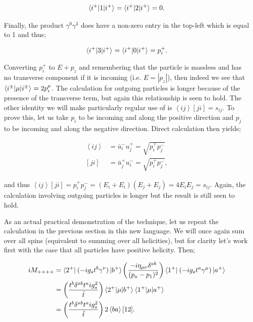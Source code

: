\begin{equation}
\mathinner{\langle i^+\vert1\vert i^+\rangle}_{} = \mathinner{\langle i^+\vert2\vert i^+\rangle}_{} = 0.
\end{equation}

Finally, the product $\gamma^0 \gamma^3$ does have a non-zero entry in the top-left which is equal to 1 and thus;

\begin{equation}
\mathinner{\langle i^+\vert3\vert i^+\rangle}_{} = \mathinner{\langle i^+\vert0\vert i^+\rangle}_{} =  p_i^+.
\end{equation}

Converting $p_i^+$ to $E + p_z$ and remembering that the particle is massless and has no transverse component if it is incoming (i.e. $E = |p_z|$), then indeed we see that $\mathinner{\langle i^\pm\vert\mu\vert i^\pm\rangle}_{} = 2p_i^\mu$. The calculation for outgoing particles is longer because of the presence of the transverse term, but again this relationship is seen to hold. The other identity we will make particularly regular use of is $\left<i j \right> [ji] = s_{ij}$. To prove this, let us take $p_i$ to be incoming and along the positive direction and $p_j$ to be incoming and along the negative direction. Direct calculation then yields;

\begin{equation}
\begin{split}
\left< i j \right> &= \bar{u}_i^- u_j^+ = \sqrt{p_i^+ p_j^-} \\
[ j i] &= \bar{u}_j^+ u_i^- = \sqrt{p_i^+ p_j^-},
\end{split}
\end{equation}

and thus $\left<i j \right> [ji] = p_i^+ p_j^- = (E_i + E_i)(E_j + E_j) = 4 E_i E_j = s_{ij}$. Again, the calculation involving outgoing particles is longer but the result is still seen to hold. 

As an actual practical demonstration of the technique, let us repeat the calculation in the previous section in this new language. We will once again sum over all spins (equivalent to summing over all helicities), but for clarity let's work first with the case that all particles have positive helicity. Then;

\begin{equation}
\begin{split}
iM_{++++} &= \mathinner{\langle 2^+\rvert}_{}(-i g_s t^b \gamma^\nu) \mathinner{\lvert b^+\rangle}_{\hspace{-0.1em}} \left( \frac{- i \eta_{\mu \nu}\delta^{ab}}{(p_a - p_1)^2} \right)\mathinner{\langle 1^+\rvert}_{} (-i g_s t^a \gamma^\mu)\mathinner{\lvert a^+\rangle}_{\hspace{-0.1em}} \\
& = \left(\frac{t^b \delta^{ab} t^a i g_s^2}{\hat{t}} \right) \mathinner{\langle2^+\vert\mu\vert b^+\rangle}_{} \mathinner{\langle1^+\vert\mu\vert a^+\rangle}_{} \\
& = \left(\frac{t^b \delta^{ab} t^a i g_s^2}{\hat{t}} \right) 2 \left<b a \right> [1 2]. 
\end{split}
\end{equation}

